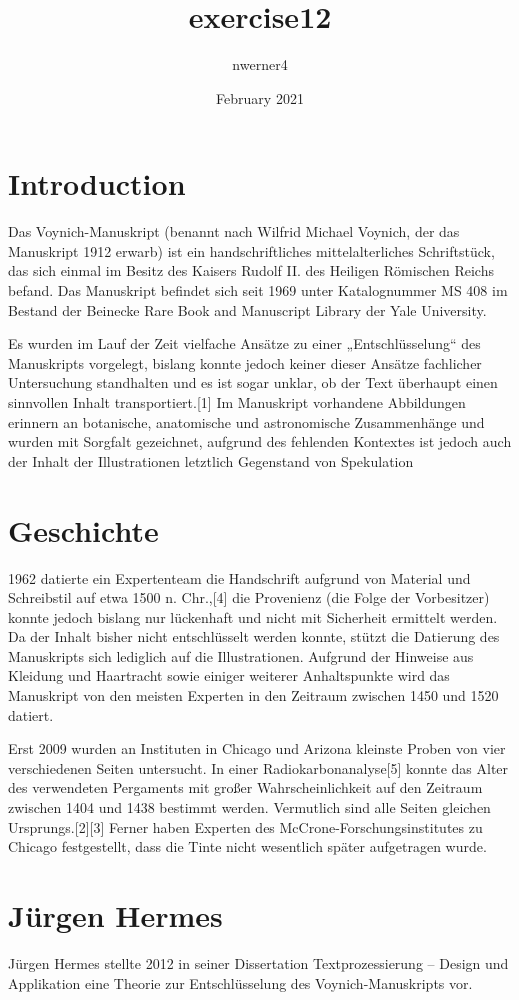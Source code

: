 \documentclass[12]{scrartcl}
\title{exercise12}
\author{nwerner4}
\date{February 2021}
\begin{document}
\tableofcontents
\newpage
\section{Introduction}
Das Voynich-Manuskript (benannt nach Wilfrid Michael Voynich, der das Manuskript 1912 erwarb) ist ein handschriftliches mittelalterliches Schriftstück, das sich einmal im Besitz des Kaisers Rudolf II. des Heiligen Römischen Reichs befand. Das Manuskript befindet sich seit 1969 unter Katalognummer MS 408 im Bestand der Beinecke Rare Book and Manuscript Library der Yale University.


Es wurden im Lauf der Zeit vielfache Ansätze zu einer „Entschlüsselung“ des Manuskripts vorgelegt, bislang konnte jedoch keiner dieser Ansätze fachlicher Untersuchung standhalten und es ist sogar unklar, ob der Text überhaupt einen sinnvollen Inhalt transportiert.[1] Im Manuskript vorhandene Abbildungen erinnern an botanische, anatomische und astronomische Zusammenhänge und wurden mit Sorgfalt gezeichnet, aufgrund des fehlenden Kontextes ist jedoch auch der Inhalt der Illustrationen letztlich Gegenstand von Spekulation

\section{Geschichte}
1962 datierte ein Expertenteam die Handschrift aufgrund von Material und Schreibstil auf etwa 1500 n. Chr.,[4] die Provenienz (die Folge der Vorbesitzer) konnte jedoch bislang nur lückenhaft und nicht mit Sicherheit ermittelt werden. Da der Inhalt bisher nicht entschlüsselt werden konnte, stützt die Datierung des Manuskripts sich lediglich auf die Illustrationen. Aufgrund der Hinweise aus Kleidung und Haartracht sowie einiger weiterer Anhaltspunkte wird das Manuskript von den meisten Experten in den Zeitraum zwischen 1450 und 1520 datiert.

Erst 2009 wurden an Instituten in Chicago und Arizona kleinste Proben von vier verschiedenen Seiten untersucht. In einer Radiokarbonanalyse[5] konnte das Alter des verwendeten Pergaments mit großer Wahrscheinlichkeit auf den Zeitraum zwischen 1404 und 1438 bestimmt werden. Vermutlich sind alle Seiten gleichen Ursprungs.[2][3] Ferner haben Experten des McCrone-Forschungsinstitutes zu Chicago festgestellt, dass die Tinte nicht wesentlich später aufgetragen wurde.

\section {Jürgen Hermes}
Jürgen Hermes stellte 2012 in seiner Dissertation Textprozessierung – Design und Applikation eine Theorie zur Entschlüsselung des Voynich-Manuskripts vor.
\end{document}
